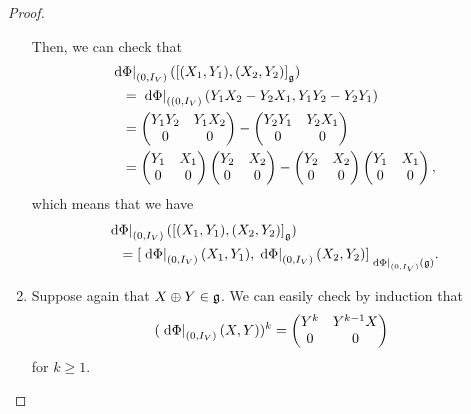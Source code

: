 \begin{proof}
\begin{enumerate}
            Then, we can check that
            \begin{align*}
                &\eval {\dd \Phi} {(0, \Id \VectorSpace)} (\LieBracket {(X_1, Y_1)} {(X_2, Y_2)})\\
                &\quad= \eval {\dd \Phi} {((0, \Id \VectorSpace)} (Y_1 X_2 - Y_2 X_1, Y_1 Y_2 - Y_2 Y_1)\\
                &\quad=
                \begin{pmatrix}
                    Y_1 Y_2 & Y_1 X_2\\
                    0 & 0
                \end{pmatrix}
                -
                \begin{pmatrix}
                    Y_2 Y_1 & Y_2 X_1\\
                    0 & 0
                \end{pmatrix}\\
                &\quad=
                \begin{pmatrix}
                    Y_1 & X_1\\
                    0 & 0
                \end{pmatrix}
                \begin{pmatrix}
                    Y_2 & X_2\\
                    0 & 0
                \end{pmatrix}
                -
                \begin{pmatrix}
                    Y_2 & X_2\\
                    0 & 0
                \end{pmatrix}
                \begin{pmatrix}
                    Y_1 & X_1\\
                    0 & 0
                \end{pmatrix},
            \end{align*}
            which means that we have
            \begin{align*}
                &\eval {\dd \Phi} {(0, \Id \VectorSpace)} (\LieBracket {(X_1, Y_1)} {(X_2, Y_2)})\\
                &\quad =
                \LieBracket [\eval {\dd \Phi} {(0, \Id \VectorSpace)} (\LieAlgebra)]
                {\eval {\dd \Phi} {(0, \Id \VectorSpace)} (X_1, Y_1)}
                {\eval {\dd \Phi} {(0, \Id \VectorSpace)} (X_2, Y_2)}.
            \end{align*}
        \item
            Suppose again that $X \oplus Y \in \LieAlgebra$.
            We can easily check by induction that
            \begin{align*}
                (\eval {\dd \Phi} {(0, \Id \VectorSpace)} (X, Y))^k
                =
                \begin{pmatrix}
                    Y^k & Y^{k - 1} X\\
                    0 & 0
                \end{pmatrix}
            \end{align*}
            for $k \geq 1$.


\end{enumerate}
\end{proof}
